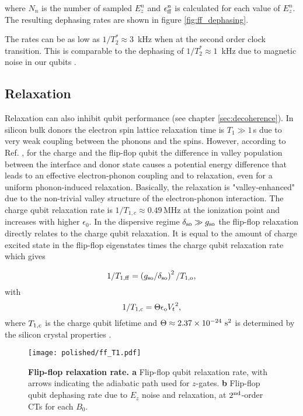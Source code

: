 where $N_n$ is the number of sampled $E_z^n$ and $\epsilon_{\rm ff}^n$ is calculated for each value of $E_z^n$. The resulting dephasing rates are shown in figure \ref{fig:ff_dephasing}. 

The rates can be as low as $1/T_2^{\ast} \approx 3$~kHz when at the second order clock transition. This is comparable to the dephasing of $1/T_2^{\ast} \approx 1$~kHz due to magnetic noise in our qubits \cite{Muhonen2014}. 

\subsection{Relaxation}

Relaxation can also inhibit qubit performance (see chapter \ref{sec:decoherence}). In silicon bulk donors the electron spin lattice relaxation time is $T_1\gg 1\,$s due to very weak coupling between the phonons and the spins. However, according to Ref. \cite{Boross2016},  for the charge and the flip-flop qubit the difference in valley population between the interface and donor state causes a potential energy difference that leads to an effective electron-phonon coupling and to relaxation, even for a uniform phonon-induced relaxation. Basically, the relaxation is "valley-enhanced" due to the non-trivial valley structure of the electron-phonon interaction. The charge qubit relaxation rate is $1/T_{1,c}\approx 0.49\,$MHz at the ionization point and increases with higher $\epsilon_0$. 
In the dispersive regime $\delta_{\rm so}\gg g_{\rm so}$ the flip-flop relaxation directly relates to the charge qubit relaxation. It is equal to the amount of charge excited state in the flip-flop eigenstates times the charge qubit relaxation rate which gives

\begin{equation}\label{eq:T1ff}
{1}/{T_{1,\rm ff}}=\left({g_{\rm so}}/{\delta_{\rm so}}\right)^2/{T_{1,\rm o}},
\end{equation}
with 
\begin{equation}\label{eq:T1o}
{1}/{T_{1,\rm c}}=\Theta\epsilon_{\rm o}{V_t}^2,
\end{equation}
where $T_{1,\rm c}$ is the charge qubit lifetime and $\Theta\approx2.37\times10^{-24}~{\rm s}^2$ is determined by the silicon crystal properties \cite{Boross2016}.

\begin{figure}[h]
	\centering
	\texttt{[image: polished/ff\_T1.pdf]}
	\caption[Flip-flop relaxation rate]{\textbf{Flip-flop relaxation rate. a }Flip-flop qubit relaxation rate, with arrows indicating the adiabatic path used for $z$-gates. \textbf{b} Flip-flop qubit dephasing rate due to $E_z$ noise and relaxation, at $2^{\rm nd}$-order CTs for each $B_0$.}
	\label{fig:T1}
\end{figure}

